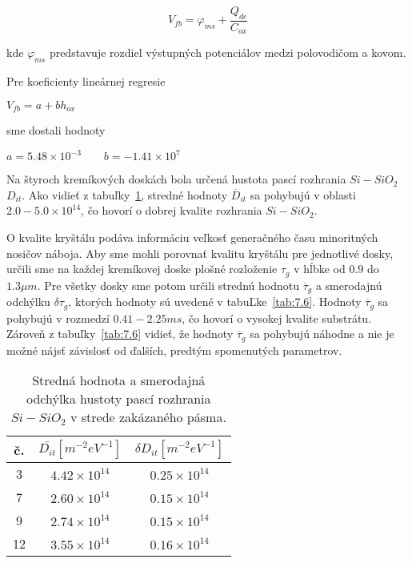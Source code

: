 \begin{equation}\label{eq:7.3}
  V_{fb}  = \varphi_{ms} + \frac{Q_{dc}}{C_{ox}}
\end{equation}

kde $\varphi_{ms}$ predstavuje rozdiel výstupných potenciálov medzi
polovodičom a kovom.

Pre koeficienty lineárnej regresie 

\centerline{$V_{fb}  = a + b h_{ox}$}

sme dostali hodnoty 

\centerline{$a = 5.48 \times 10^{-3}  \qquad  b = -1.41 \times 10^{7}$}

Na štyroch kremíkových doskách bola určená hustota pascí rozhrania
$Si-SiO_2$ $D_{it}$. Ako vidieť z tabuľky~\ref{tab:7.5}, stredné
hodnoty $\overline D_{it}$ sa pohybujú v oblasti $2.0-5.0\times
10^{14}$, čo hovorí o dobrej kvalite rozhrania $Si-SiO_{2}$.

O kvalite kryštálu podáva informáciu veľkosť generačného času
minoritných nosičov náboja. Aby sme mohli porovnať kvalitu kryštálu
pre jednotlivé dosky, určili sme na každej kremíkovej doske plošné
rozloženie $\tau_{g}$ v hĺbke od $0.9$ do $1.3\mu m$. Pre všetky dosky
sme potom určili strednú hodnotu $\overline\tau_{g}$ a smerodajnú
odchýlku $\delta\tau_{g}$, ktorých hodnoty sú uvedené v
tabuĽke~\ref{tab:7.6}. Hodnoty $\overline\tau_{g}$ sa pohybujú v
rozmedzí $0.41 - 2.25 ms$, čo hovorí o vysokej kvalite
substrátu. Zároveň z tabuľky~\ref{tab:7.6} vidieť, že hodnoty
$\overline \tau_{g}$ sa pohybujú náhodne a nie je možné nájsť
závislosť od ďalších, predtým spomenutých parametrov.

\begin{table}[h!]\centering
  \begin{tabular}{c c c}
    č. & ${\bar{D_{it}}}[m^{-2}eV^{-1}]$ & $\delta D_{it}[m^{-2}eV^{-1}]$\\ 
    \hline
     3 & $4.42 \times 10^{14}$ & $0.25 \times 10^{14}$\\
     7 & $2.60 \times 10^{14}$ & $0.15 \times 10^{14}$\\
     9 & $2.74 \times 10^{14}$ & $0.15 \times 10^{14}$\\
    12 & $3.55 \times 10^{14}$ & $0.16 \times 10^{14}$\\
  \end{tabular}
  \caption[Stredná hodnota a smerodajná odchýlka hustoty pascí
    rozhrania $Si-SiO_{2}$ v strede zakázaného pásma.]{Stredná hodnota
    a smerodajná odchýlka hustoty pascí rozhrania $Si-SiO_{2}$ v
    strede zakázaného pásma.}\label{tab:7.5}
\end{table}

